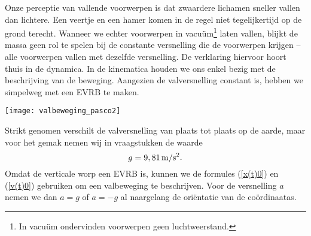 \documentclass{ximera}
\begin{document}
	\author{Bart Lambregs}
    \xmsource



	Onze perceptie van vallende voorwerpen is dat zwaardere lichamen sneller vallen dan lichtere. Een veertje en een hamer komen in de regel niet tegelij\-ker\-tijd op de grond terecht. Wanneer we echter voorwerpen in vacu\"um\footnote{In vacu\"um ondervinden voorwerpen geen luchtweerstand.} laten vallen, blijkt de massa geen rol te spelen bij de constante versnelling die de voorwerpen krijgen -- alle voorwerpen vallen met dezelfde versnelling. De verklaring hiervoor hoort thuis in de dynamica. In de kinematica houden we ons enkel bezig met de beschrijving van de beweging. Aangezien de valversnelling constant is, hebben we simpelweg met een EVRB te maken.
	\begin{image}
	
	\texttt{[image: valbeweging\_pasco2]}
	\end{image}
	Strikt genomen verschilt de valversnelling van plaats tot plaats op de aarde, maar voor het gemak nemen wij in vraagstukken de waarde
	\[g=9,81\rm\,m/s^2.\]
	Omdat de verticale worp een EVRB is, kunnen we de formules (\ref{x(t)0}) en (\ref{v(t)0}) gebruiken om een valbeweging te beschrijven. Voor de versnelling $a$ nemen we dan $a=g$ of $a=-g$ al naargelang de oriëntatie van de coördinaatas.
	
	\clearpage
	
\end{document}
